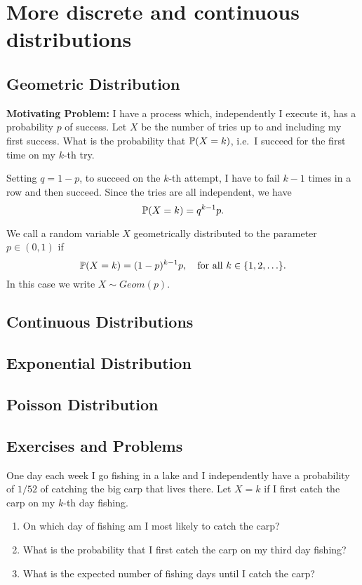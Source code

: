 \section{More discrete and continuous distributions}

\subsection{Geometric Distribution}
\textbf{Motivating Problem:} I have a process which, independently I execute it, has a probability $p$ of success. Let $X$ be the number of tries up to and including my first success. What is the probability that ${\mathbb P}(X=k)$, i.e.\ I succeed for the first time on my $k$-th try. 

Setting $q=1-p$, to succeed on the $k$-th attempt, I have to fail $k-1$ times in a row and then succeed. Since the tries are all independent, we have 
 \[
         {\mathbb P}(X=k) = q^{k-1} p. 
  \] 
\begin{defn}
We call a random variable $X$ geometrically distributed to the parameter $p \in (0,1)$ if
\[ {\mathbb P}(X=k)= (1-p)^{k-1}p, \quad \text{for all } k \in \{ 1,2,\ldots \}.\]
In this case we write $X \sim Geom(p)$.
\end{defn}
\subsection{Continuous Distributions}

\subsection{Exponential Distribution}

\subsection{Poisson Distribution}

\subsection{Exercises and Problems}
\begin{exer} 
One day each week I go fishing in a lake and  I independently have a probability of $1/52$ of catching the big carp that lives there.
Let $X=k$ if I first catch the carp on my $k$-th day fishing. 
\begin{enumerate}
    \item On which day of fishing am I most likely to catch the carp? 
    \item What is the probability that I first catch the carp on my third day fishing? 
    \item What is the expected number of fishing days until I catch the carp? 
\end{enumerate}
\end{exer}
